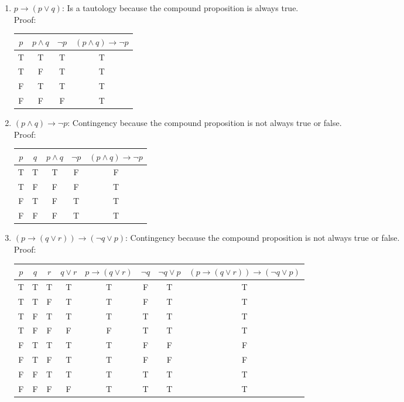 \documentclass[11pt]{article}
\begin{document}
\begin{enumerate}
\begin{enumerate}[label=(\alph*)]
\item
$p \rightarrow (p \vee q)$: Is a tautology because the compound proposition is always true. \\
Proof: \\
\begin{tabular}{|c|c|c|c|} \hline
$p$ & $p \wedge q$ & $\lnot p$ & $(p \wedge q) \rightarrow \lnot p$ \\
\hline
T&T&T&T \\
\hline
T&F&T&T \\
\hline
F&T&T&T \\ 
\hline
F&F&F&T \\
\hline
\end{tabular}
\item 
$(p \wedge q) \rightarrow \lnot p$: Contingency because the compound proposition is not always true or false. \\
Proof: \\
\begin{tabular}{|c|c|c|c|c|} \hline
$p$ & $q$ & $p \wedge q$ & $\lnot p$ & $(p \wedge q) \rightarrow \lnot p$ \\
\hline
T&T&T&F&F \\
\hline
T&F&F&F&T \\
\hline
F&T&F&T&T \\
\hline
F&F&F&T&T \\
\hline
\end{tabular}
\item 
$(p \rightarrow (q \vee r)) \rightarrow (\lnot q \vee p)$: Contingency because the compound proposition is not always true or false. \\
Proof: \\
\begin{tabular}{|c|c|c|c|c|c|c|c|} \hline
$p$ & $q$ & $r$ & $q \vee r$ & $p \rightarrow (q \vee r)$ & $ \lnot q$ & $\lnot q \vee p$ & $(p \rightarrow (q\vee r)) \rightarrow (\lnot q \vee p)$ \\
\hline
T&T&T&T&T&F&T&T \\
\hline
T&T&F&T&T&F&T&T \\ 
\hline
T&F&T&T&T&T&T&T \\
\hline
T&F&F&F&F&T&T&T \\
\hline
F&T&T&T&T&F&F&F \\
\hline
F&T&F&T&T&F&F&F \\ 
\hline
F&F&T&T&T&T&T&T \\
\hline
F&F&F&F&T&T&T&T \\

\end{tabular}
\end{enumerate}
\end{enumerate}
\end{document}
